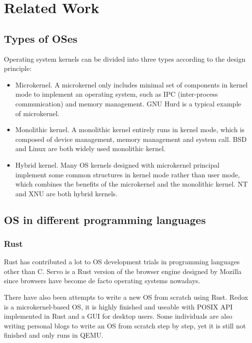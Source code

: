 \section{Related Work}

\subsection{Types of OSes}

Operating system kernels can be divided into three types according to the design principle:

    \begin{itemize}
        \item Microkernel. A microkernel only includes minimal set of components in kernel mode to implement an operating system, such as IPC (inter-process communication) and memory management. GNU Hurd\cite{stallman1998gnu} is a typical example of microkernel.
        \item Monolithic kernel. A monolithic kernel entirely runs in kernel mode, which is composed of device management, memory management and system call. BSD\cite{mckusick1996design} and Linux\cite{stallman1997linux} are both widely used monolithic kernel.
        \item Hybrid kernel. Many OS kernels designed with microkernel principal implement some common structures in kernel mode rather than user mode, which combines the benefits of the microkernel and the monolithic kernel. NT\cite{solomon1998inside} and XNU\cite{singh2006mac} are both hybrid kernels.
    \end{itemize}

\subsection{OS in different programming languages}

\subsubsection{Rust}
Rust has contributed a lot to OS development trials in programming languages other than C.
Servo\cite{Servo} is a Rust version of the browser engine designed by Mozilla since browsers have become de facto operating systems nowadays.

There have also been attempts to write a new OS from scratch using Rust.
Redox\cite{Redox} is a microkernel-based OS, it is highly finished and useable with POSIX API implemented in Rust and a GUI for desktop users.
Some individuals are also writing personal blogs\cite{OsPhil} to write an OS from scratch step by step, yet it is still not finished and only runs in QEMU. 

